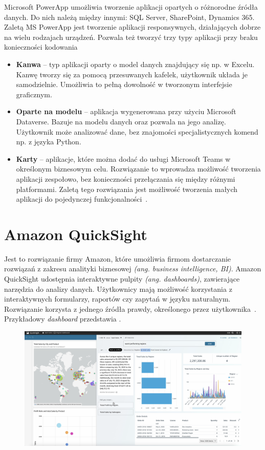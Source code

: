Microsoft PowerApp umożliwia tworzenie aplikacji opartych o różnorodne źródła danych. Do nich należą między innymi: SQL Server, SharePoint, Dynamics 365. Zaletą MS PowerApp jest tworzenie aplikacji responsywnych, działających dobrze na wielu rodzajach urządzeń. Pozwala też tworzyć trzy typy aplikacji przy braku konieczności kodowania

\begin{itemize}
    \item \textbf{Kanwa} -- typ aplikacji oparty o model danych znajdujący się np. w Excelu. Kanwę tworzy się za pomocą przesuwanych kafelek, użytkownik układa je samodzielnie. Umożliwia to pełną dowolność w tworzonym interfejsie graficznym.

    \item \textbf{Oparte na modelu} -- aplikacja wygenerowana przy użyciu Microsoft Dataverse. Bazuje na modelu danych oraz pozwala na jego analizę. Użytkownik może analizować dane, bez znajomości specjalistycznych komend np. z języka Python.

    \item \textbf{Karty} -- aplikacje, które można dodać do usługi Microsoft Teams w określonym biznesowym celu. Rozwiązanie to wprowadza możliwość tworzenia aplikacji zespołowo, bez konieczności przełączania się między różnymi platformami. Zaletą tego rozwiązania jest możliwość tworzenia małych aplikacji do pojedynczej funkcjonalności~\cite{Microsoft,Microsofta,Microsoftb,Microsoftc}.
\end{itemize}

\section{Amazon QuickSight}
Jest to rozwiązanie firmy Amazon, które umożliwia firmom dostarczanie rozwiązań z zakresu analityki biznesowej \textit{(ang. business intelligence, BI)}. Amazon QuickSight udostępnia interaktywne pulpity \textit{(ang. dashboards)}, zawierające narzędzia do analizy danych. Użytkownicy mają możliwość korzystania z interaktywnych formularzy, raportów czy zapytań w języku naturalnym. Rozwiązanie korzysta z jednego źródła prawdy, określonego przez użytkownika~\cite{AmazonQuickSight}. Przykładowy \textit{dashboard} przedstawia .
\begin{figure}[H]
    \centering
    \includegraphics[width=\textwidth]{images/amazon_qs}
    \label{fig:am-qs}
\end{figure}
\vfill
\clearpage

